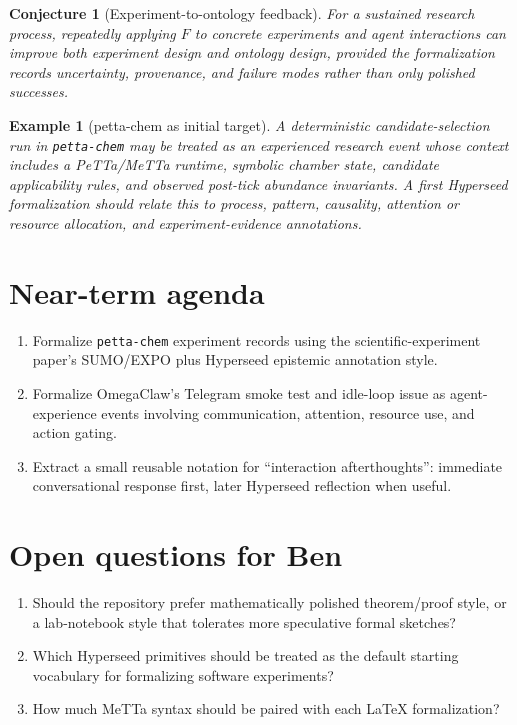 \documentclass[11pt]{article}
\newtheorem{conjecture}{Conjecture}
\newtheorem{example}{Example}
\begin{document}
\begin{conjecture}[Experiment-to-ontology feedback]
For a sustained research process, repeatedly applying $F$ to concrete experiments and
agent interactions can improve both experiment design and ontology design, provided the
formalization records uncertainty, provenance, and failure modes rather than only polished
successes.
\end{conjecture}

\begin{example}[petta-chem as initial target]
A deterministic candidate-selection run in \texttt{petta-chem} may be treated as an
experienced research event whose context includes a PeTTa/MeTTa runtime, symbolic chamber
state, candidate applicability rules, and observed post-tick abundance invariants.  A first
Hyperseed formalization should relate this to process, pattern, causality, attention or
resource allocation, and experiment-evidence annotations.
\end{example}

\section{Near-term agenda}

\begin{enumerate}
  \item Formalize \texttt{petta-chem} experiment records using the scientific-experiment
        paper's SUMO/EXPO plus Hyperseed epistemic annotation style.
  \item Formalize OmegaClaw's Telegram smoke test and idle-loop issue as agent-experience
        events involving communication, attention, resource use, and action gating.
  \item Extract a small reusable notation for ``interaction afterthoughts'': immediate
        conversational response first, later Hyperseed reflection when useful.
\end{enumerate}

\section{Open questions for Ben}

\begin{enumerate}
  \item Should the repository prefer mathematically polished theorem/proof style, or a
        lab-notebook style that tolerates more speculative formal sketches?
  \item Which Hyperseed primitives should be treated as the default starting vocabulary
        for formalizing software experiments?
  \item How much MeTTa syntax should be paired with each LaTeX formalization?
\end{enumerate}
\end{document}
